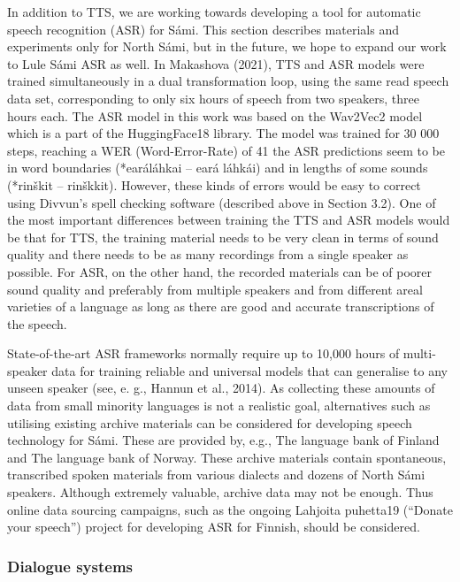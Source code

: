 \documentclass[free]{flammie}
\begin{document}
In addition to TTS, we are working towards developing a tool for automatic speech recognition (ASR) for Sámi. This section describes materials and experiments only for North
Sámi, but in the future, we hope to expand our work to Lule Sámi ASR as well. In Makashova (2021), TTS and ASR models were trained simultaneously in a dual transformation
loop, using the same read speech data set, corresponding to only six hours of speech from
two speakers, three hours each. The ASR model in this work was based on the Wav2Vec2
model which is a part of the HuggingFace18 library. The model was trained for 30 000 steps,
reaching a WER (Word-Error-Rate) of 41%
the ASR predictions seem to be in word boundaries (*earáláhkai – eará láhkái) and in
lengths of some sounds (*rinškit – rinškkit). However, these kinds of errors would be easy
to correct using Divvun’s spell checking software (described above in Section 3.2).
One of the most important differences between training the TTS and ASR models would
be that for TTS, the training material needs to be very clean in terms of sound quality and
there needs to be as many recordings from a single speaker as possible. For ASR, on the
other hand, the recorded materials can be of poorer sound quality and preferably from multiple speakers and from different areal varieties of a language as long as there are good and
accurate transcriptions of the speech.

State-of-the-art ASR frameworks normally require up to 10,000 hours of multi-speaker
data for training reliable and universal models that can generalise to any unseen speaker
(see, e. g., Hannun et al., 2014). As collecting these amounts of data from small minority
languages is not a realistic goal, alternatives such as utilising existing archive materials can
be considered for developing speech technology for Sámi. These are provided by, e.g., The
language bank of Finland and The language bank of Norway. These archive materials contain spontaneous, transcribed spoken materials from various dialects and dozens of North
Sámi speakers. Although extremely valuable, archive data may not be enough. Thus online
data sourcing campaigns, such as the ongoing Lahjoita puhetta19 (“Donate your speech”)
project for developing ASR for Finnish, should be considered.

\subsubsection{Dialogue systems}
\end{document}
